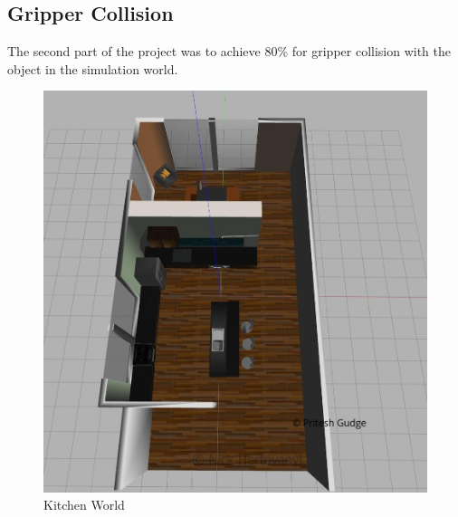 \documentclass[10pt,journal,compsoc]{IEEEtran}
\begin{document}
\subsection{Gripper Collision}
The second part of the project was to achieve 80\% for gripper collision with the object in the simulation world.

\begin{figure}[thpb]
      \centering
      \includegraphics[width=\linewidth]{images/gazebokitchenworld}
      \caption{Kitchen World}
      \label{fig:kitchenworld}
\end{figure}
\end{document}
